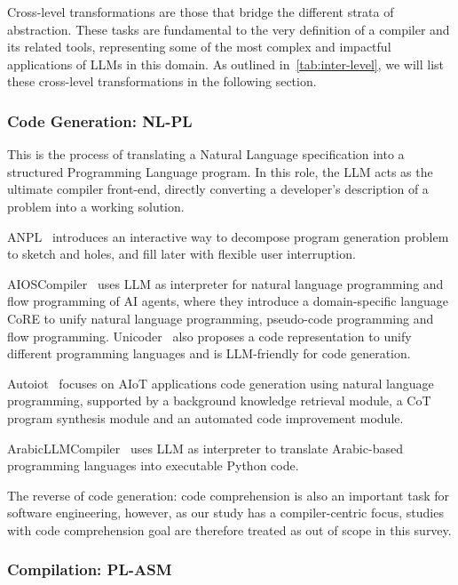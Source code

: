 \documentclass[pdflatex,sn-mathphys-ay,twocolumn, a4paper]{sn-jnl}%
\theoremstyle{thmstyleone}%
\theoremstyle{thmstyletwo}%
\theoremstyle{thmstylethree}%
\begin{document}
Cross-level transformations are those that bridge the different strata of abstraction. These tasks are fundamental to the very definition of a compiler and its related tools, representing some of the most complex and impactful applications of LLMs in this domain. As outlined in~\autoref{tab:inter-level}, we will list these cross-level transformations in the following section.

\subsubsection{Code Generation: NL-PL}

This is the process of translating a Natural Language specification into a structured Programming Language program. In this role, the LLM acts as the ultimate compiler front-end, directly converting a developer's description of a problem into a working solution.

ANPL~\citep{138_ANPL23_neurips} introduces an interactive way to decompose program generation problem to sketch and holes, and fill later with flexible user interruption.

AIOSCompiler~\citep{23_xu2024aios} uses LLM as interpreter for natural language programming and flow programming of AI agents, where they introduce a domain-specific language CoRE to unify natural language programming, pseudo-code programming and flow programming.
Unicoder~\citep{92_sun-etal-2024-unicoder} also proposes a code representation to unify different programming languages and is LLM-friendly for code generation.

Autoiot~\citep{59_autoiot2025_mobicom} focuses on AIoT applications code generation using natural language programming, supported by a background knowledge retrieval module, a CoT program synthesis module and an automated code improvement module.

ArabicLLMCompiler~\citep{25_sibaee2024llms} uses LLM as interpreter to translate Arabic-based programming languages into executable Python code.

The reverse of code generation: code comprehension is also an important task for software engineering, however, as our study has a compiler-centric focus, studies with code comprehension goal are therefore treated as out of scope in this survey. 

\subsubsection{Compilation: PL-ASM}
\end{document}
